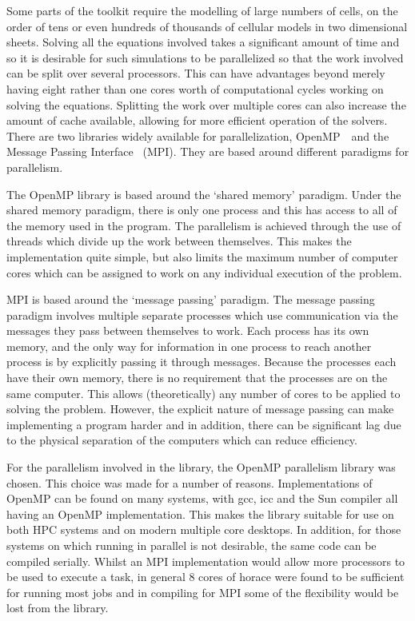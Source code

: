 Some parts of the toolkit require the modelling of large numbers of cells, on
the order of tens or even hundreds of thousands of cellular models in two
dimensional sheets.  Solving all the equations involved takes a significant
amount of time and so it is desirable for such simulations to be parallelized so
that the work involved can be split over several processors.  This can have
advantages beyond merely having eight rather than one cores worth of
computational cycles working on solving the equations.  Splitting the work over
multiple cores can also increase the amount of cache available, allowing for
more efficient operation of the solvers.
There are two libraries widely available for parallelization,
OpenMP~\cite{OpenMP}\ and the Message Passing Interface~\cite{MPI} (MPI).
They are based around different paradigms for parallelism.

The OpenMP library is based around the `shared memory' paradigm.
Under the shared memory paradigm, there is only one process and this has access
to all of the memory used in the program.
The parallelism is achieved through the use of threads which divide up the work
between themselves.
This makes the implementation quite simple, but also limits the maximum number
of computer cores which can be assigned to work on any individual execution of
the problem.

MPI is based around the `message passing' paradigm.
The message passing paradigm involves multiple separate processes which use
communication via the messages they pass between themselves to work.
Each process has its own memory, and the only way for information in one process
to reach another process is by explicitly passing it through messages.
Because the processes each have their own memory, there is no requirement that
the processes are on the same computer.
This allows (theoretically) any number of cores to be applied to solving the
problem.
However, the explicit nature of message passing can make implementing a program
harder and in addition, there can be significant lag due to the physical
separation of the computers which can reduce efficiency.

For the parallelism involved in the library, the OpenMP parallelism library was
chosen.
This choice was made for a number of reasons.
Implementations of OpenMP can be found on many systems, with gcc, icc and the
Sun compiler all having an OpenMP implementation.
This makes the library suitable for use on both HPC systems and on modern
multiple core desktops.
In addition, for those systems on which running in parallel is not desirable,
the same code can be compiled serially.
Whilst an MPI implementation would allow more processors to be used to execute a
task, in general 8 cores of horace were found to be sufficient for running most
jobs and in compiling for MPI some of the flexibility would be lost from the
library.

